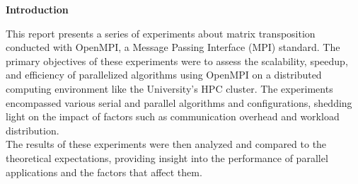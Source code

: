 \begin{center}
    \textbf{Introduction}
\end{center}

This report presents a series of experiments about matrix transposition conducted %
with OpenMPI, a Message Passing Interface (MPI) standard. The primary objectives %
of these experiments were to assess the scalability, speedup, and efficiency of %
parallelized algorithms using OpenMPI on a distributed computing environment like %
the University's HPC cluster. The experiments encompassed various serial and parallel %
algorithms and configurations, shedding light on the impact of factors such as %
communication overhead and workload distribution.\\
The results of these experiments were then analyzed and compared to the theoretical %
expectations, providing insight into the performance of parallel applications %
and the factors that affect them.